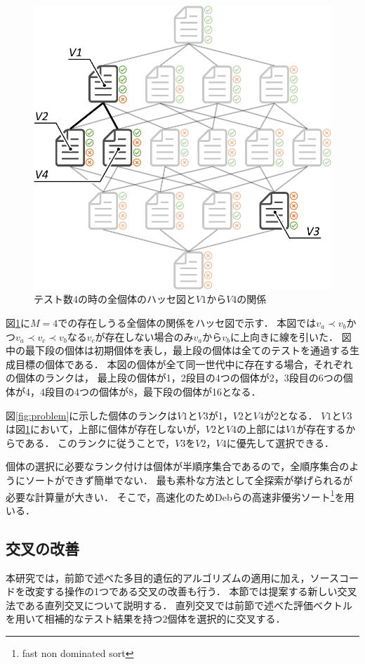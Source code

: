 \documentclass[uplatex,dvipdfmx,a4paper]{jsarticle}
\let\oldcite\cite
\renewcommand{\cite}[1]{\xspace\oldcite{#1}}
\begin{document}
\begin{figure}[t]
  \centering
  \includegraphics[width=\linewidth]{fig/test4Hasse.pdf}
  \caption{テスト数4の時の全個体のハッセ図と$V1$から$V4$の関係}
  \label{fig:pd}
\end{figure}

図\ref{fig:pd}に$M=4$での存在しうる全個体の関係をハッセ図で示す．
本図では$v_a \prec v_b$かつ$v_a \prec v_c \prec v_b$なる$v_c$が存在しない場合のみ$v_a$から$v_b$に上向きに線を引いた．
図中の最下段の個体は初期個体を表し，最上段の個体は全てのテストを通過する生成目標の個体である．
本図の個体が全て同一世代中に存在する場合，それぞれの個体のランクは，
最上段の個体が1，2段目の4つの個体が2，3段目の6つの個体が4，4段目の4つの個体が8，最下段の個体が16となる．

図\ref{fig:problem}に示した個体のランクは$V1$と$V3$が1，$V2$と$V4$が2となる．
$V1$と$V3$は図\ref{fig:pd}において，上部に個体が存在しないが，$V2$と$V4$の上部には$V1$が存在するからである．
このランクに従うことで，$V3$を$V2$，$V4$に優先して選択できる．

個体の選択に必要なランク付けは個体が半順序集合であるので，全順序集合のようにソートができず簡単でない．
最も素朴な方法として全探索が挙げられるが必要な計算量が大きい．
そこで，高速化のためDebらの高速非優劣ソート\footnote{fast non dominated sort}\cite{deb2002fast}を用いる．


\subsection{交叉の改善}
本研究では，前節で述べた多目的遺伝的アルゴリズムの適用に加え，ソースコードを改変する操作の1つである交叉の改善も行う．
本節では提案する新しい交叉法である直列交叉について説明する．
直列交叉では前節で述べた評価ベクトルを用いて相補的なテスト結果を持つ2個体を選択的に交叉する．
\end{document}
